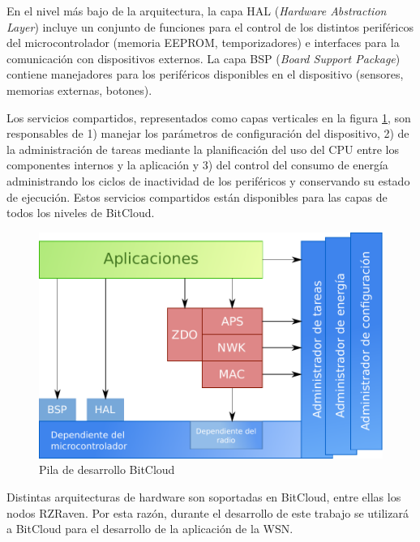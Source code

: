 En el nivel más bajo de la arquitectura, la capa HAL (\textit{Hardware Abstraction Layer}) incluye un conjunto de funciones para el control de los distintos periféricos del microcontrolador (memoria EEPROM, temporizadores) e interfaces para la comunicación con dispositivos externos. La capa BSP (\textit{Board Support Package}) contiene manejadores para los periféricos disponibles en el dispositivo (sensores, memorias externas, botones). 

Los servicios compartidos, representados como capas verticales en la figura \ref{fig:bitcloud}, son responsables de 1) manejar los parámetros de configuración del dispositivo, 2) de la administración de tareas mediante la planificación del uso del CPU entre los componentes internos y la aplicación y 3) del control del consumo de energía administrando los ciclos de inactividad de los periféricos y conservando su estado de ejecución. Estos servicios compartidos están disponibles para las capas de todos los niveles de BitCloud.

\begin{figure}
	\centering 
	\includegraphics[scale=0.5]{capitulo_2_imgs/pila_bitcloud.pdf}
	\caption{Pila de desarrollo BitCloud}
	\label{fig:bitcloud}
\end{figure}

Distintas arquitecturas de hardware son soportadas en BitCloud, entre ellas los nodos RZRaven. Por esta razón, durante el desarrollo de este trabajo se utilizará a BitCloud para el desarrollo de la aplicación de la WSN. 


